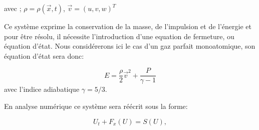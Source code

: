 avec ;
$\rho = \rho(\vec{x},t)$,
$ \vec{v} = (u,v,w)^T$

Ce système exprime la conservation de la masse, de l'impulsion et de l'énergie et pour être résolu, il nécessite l'introduction d'une equation de fermeture, ou équation d'état.
Nous considérerons ici le cas d'un gaz parfait monoatomique, son équation d'état sera donc:

%
\begin{equation}
E = \frac{\rho}{2	}\vec{v}^2 + \frac{P}{\gamma -1}
\end{equation}
avec l'indice adiabatique $\gamma = 5/3$.





%



En analyse numérique ce système sera réécrit sous la forme:

\begin{equation}
U_t+F_x(U) = S(U),
\label{eq:conservation}
\end{equation}


